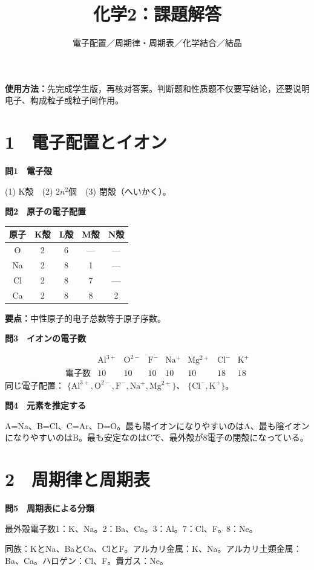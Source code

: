 \documentclass[11pt,a4paper]{ctexart}
\title{\color{JapanBlue}\bfseries 化学2：課題解答}
\author{電子配置／周期律・周期表／化学結合／結晶}
\date{}
\newcommand{\qtitle}[2]{\vspace{2mm}\noindent\textcolor{JapanBlue}{\textbf{問#1　#2}}\par}
\newcommand{\point}[1]{\textcolor{ChinaRed}{\textbf{要点：}}#1}
\begin{document}
\maketitle
\begin{center}
\colorbox{SoftBlue}{\parbox{.91\linewidth}{
\textbf{使用方法：}先完成学生版，再核对答案。判断题和性质题不仅要写结论，还要说明电子、构成粒子或粒子间作用。
}}
\end{center}

\section*{1　電子配置とイオン}

\qtitle{1}{電子殻}
(1) K殻　(2) $2n^2$個　(3) 閉殻（へいかく）。

\qtitle{2}{原子の電子配置}
\begin{center}
\renewcommand{\arraystretch}{1.35}
\begin{tabular}{c|c|c|c|c}
\toprule
原子 & K殻 & L殻 & M殻 & N殻\\ \midrule
O  & 2 & 6 & --- & ---\\
Na & 2 & 8 & 1 & ---\\
Cl & 2 & 8 & 7 & ---\\
Ca & 2 & 8 & 8 & 2\\
\bottomrule
\end{tabular}
\end{center}
\point{中性原子的电子总数等于原子序数。}

\qtitle{3}{イオンの電子数}
\[
\begin{array}{c|ccccccc}
&\mathrm{Al^{3+}}&\mathrm{O^{2-}}&\mathrm{F^-}&\mathrm{Na^+}&\mathrm{Mg^{2+}}&\mathrm{Cl^-}&\mathrm{K^+}\\ \hline
\text{電子数}&10&10&10&10&10&18&18
\end{array}
\]
同じ電子配置：
$\{\mathrm{Al^{3+},O^{2-},F^-,Na^+,Mg^{2+}}\}$、
$\{\mathrm{Cl^-,K^+}\}$。

\qtitle{4}{元素を推定する}
A=Na、B=Cl、C=Ar、D=O。最も陽イオンになりやすいのはA、最も陰イオンになりやすいのはB。最も安定なのはCで、最外殻が8電子の閉殻になっている。

\section*{2　周期律と周期表}

\qtitle{5}{周期表による分類}
最外殻電子数1：K、Na。2：Ba、Ca。3：Al。7：Cl、F。8：Ne。

同族：KとNa、BaとCa、ClとF。アルカリ金属：K、Na。アルカリ土類金属：Ba、Ca。ハロゲン：Cl、F。貴ガス：Ne。
\end{document}
